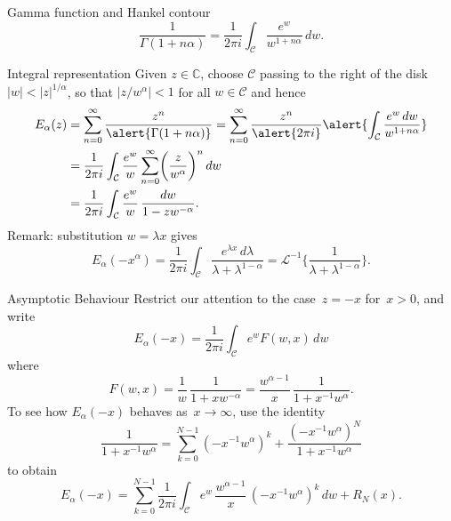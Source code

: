 \documentclass{beamer}
\begin{document}
\begin{frame}{Gamma function and Hankel contour}
\[
\frac{1}{\Gamma(1+n\alpha)}=\frac{1}{2\pi i}\int_{\mathcal{C}}
    \frac{e^w}{w^{1+n\alpha}}\,dw.
\]
\vfill
\begin{center}
\end{center}
\end{frame}
\begin{frame}{Integral representation}
Given $z\in\mathbb{C}$, choose $\mathcal{C}$ passing to the right of the
disk~$|w|<|z|^{1/\alpha}$, so that $|z/w^\alpha|<1$ for all 
$w\in\mathcal{C}$ and hence
\begin{align*}
E_\alpha(z)&=\sum_{n=0}^\infty\frac{z^n}{\alert{\Gamma(1+n\alpha)}}
    =\sum_{n=0}^\infty\frac{z^n}{\alert{2\pi i}}\alert{\int_{\mathcal{C}}
	\frac{e^w\,dw}{w^{1+n\alpha}}}\\
	&=\frac{1}{2\pi i}\int_{\mathcal{C}}\frac{e^w}{w}\sum_{n=0}^\infty
	\biggl(\frac{z}{w^\alpha}\biggr)^n\,dw\\
	&=\frac{1}{2\pi i}\int_{\mathcal{C}}
	\frac{e^w}{w}\,\frac{dw}{1-zw^{-\alpha}}.
\end{align*}
Remark: substitution $w=\lambda x$ gives
\[
E_\alpha(-x^\alpha)=\frac{1}{2\pi i}\int_{\mathcal{C}}
    \frac{e^{\lambda x}\,d\lambda}{\lambda+\lambda^{1-\alpha}}
    =\mathcal{L}^{-1}\biggl\{\frac{1}{\lambda+\lambda^{1-\alpha}}\biggr\}.
\]
\end{frame}
\begin{frame}{Asymptotic Behaviour}
Restrict our attention to the case~$z=-x$ for~$x>0$, and write
\[
E_\alpha(-x)=\frac{1}{2\pi i}\int_{\mathcal{C}}e^wF(w,x)\,dw 
\]
where
\[
F(w,x)=\frac{1}{w}\,\frac{1}{1+xw^{-\alpha}}
    =\frac{w^{\alpha-1}}{x}\,\frac{1}{1+x^{-1}w^\alpha}.
\]
To see how $E_\alpha(-x)$ behaves as~$x\to\infty$, use the identity
\[
\frac{1}{1+x^{-1}w^\alpha}=\sum_{k=0}^{N-1}(-x^{-1}w^\alpha)^k
    +\frac{(-x^{-1}w^\alpha)^N}{1+x^{-1}w^\alpha}
\]
to obtain
\[
E_\alpha(-x)=\sum_{k=0}^{N-1}\frac{1}{2\pi i}\int_{\mathcal{C}}
    e^w\,\frac{w^{\alpha-1}}{x}\,(-x^{-1}w^\alpha)^k\,dw+R_N(x).
\]
\end{frame}
\end{document}

